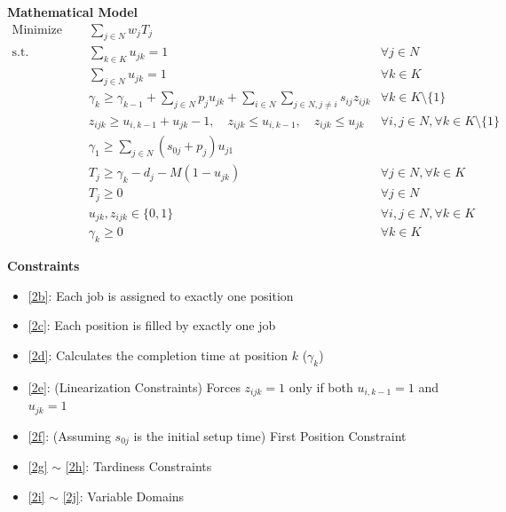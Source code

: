 \documentclass[10pt]{article}
\begin{document}
\vspace{1em}

\textbf{Mathematical Model}
\begin{subequations}
  \begin{align}
    \text{Minimize } \quad & \sum_{j \in N} w_j T_j \label{2a}\\
    \text{s.t.} \quad 
      & \sum_{k \in K} u_{jk} = 1 & \forall j \in N \label{2b} \\
      & \sum_{j \in N} u_{jk} = 1 & \forall k \in K \label{2c} \\
      & \gamma_k \geq \gamma_{k-1} + \sum_{j \in N} p_j u_{jk} + \sum_{i \in N} \sum_{j \in N, j \ne i} s_{ij} z_{ijk} & \forall k \in K \setminus \{1\} \label{2d} \\
      & z_{ijk} \geq u_{i, k-1} + u_{jk} - 1, \quad z_{ijk} \leq u_{i, k-1}, \quad z_{ijk} \leq u_{jk} & \forall i, j \in N, \forall k \in K \setminus \{1\} \label{2e} \\
      & \gamma_1 \geq \sum_{j \in N} (s_{0j} + p_j) u_{j1} \label{2f} \\
      & T_j \geq \gamma_k - d_j - M(1 - u_{jk}) & \forall j \in N, \forall k \in K \label{2g}\\
      & T_j \geq 0 & \forall j \in N \label{2h}\\
      & u_{jk}, z_{ijk} \in \{0, 1\} & \forall i, j \in N, \forall k \in K \label{2i}\\
      & \gamma_k \geq 0 & \forall k \in K \label{2j}
  \end{align}
\end{subequations}

\vspace{0.5em}

\textbf{Constraints}
\begin{itemize}[itemsep=0pt]
  \item \eqref{2b}: Each job is assigned to exactly one position
  \item \eqref{2c}: Each position is filled by exactly one job
  \item \eqref{2d}: Calculates the completion time at position $k$ ($\gamma_k$)
  \item \eqref{2e}: (Linearization Constraints) Forces $z_{ijk} = 1$ only if both $u_{i, k-1} = 1$ and $u_{jk} = 1$
  \item \eqref{2f}: (Assuming $s_{0j}$ is the initial setup time) First Position Constraint
  \item \eqref{2g} $\sim$ \eqref{2h}: Tardiness Constraints
  \item \eqref{2i} $\sim$ \eqref{2j}: Variable Domains
\end{itemize}
\end{document}
